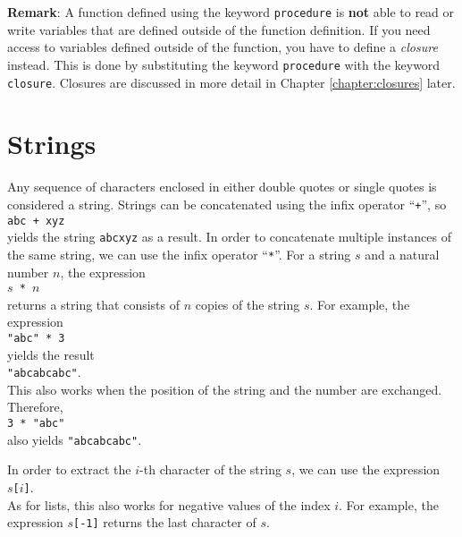 \noindent
\textbf{Remark}:
A function defined using the keyword \texttt{procedure} is \textbf{not} able to read or write
variables that are defined outside of the function definition.  If you need access to variables
defined outside of the function, you have to define a \emph{closure} instead.  This is done by
substituting the keyword \texttt{procedure} with the keyword \texttt{closure}.  Closures are
discussed in more detail in Chapter \ref{chapter:closures} later.


\section{Strings}
Any sequence of characters enclosed in either double quotes or single quotes is considered a string.
Strings can be concatenated using the infix operator ``\texttt{+}'', so
\\[0.2cm]
\hspace*{1.3cm}
\texttt{abc + xyz}
\\[0.2cm]
yields the string \texttt{abcxyz} as a result.
In order to concatenate multiple instances of the same string, we can use the infix
operator ``\texttt{*}''.  For a string $s$ and a natural number $n$, the expression
\\[0.2cm]
\hspace*{1.3cm}
\texttt{$s$ * $n$}
\\[0.2cm]
returns a string that consists of $n$ copies of the string $s$.  For example, the
expression 
\\[0.2cm]
\hspace*{1.3cm}
\texttt{"abc" * 3}
\\[0.2cm]
yields the result
\\[0.2cm]
\hspace*{1.3cm}
\texttt{"abcabcabc"}.
\\[0.2cm]
This also works when the position of the string and the number are exchanged.  Therefore,
\\[0.2cm]
\hspace*{1.3cm}
\texttt{3 * "abc"}
\\[0.2cm]
also yields \texttt{"abcabcabc"}.


In order to extract the $i$-th character of the string $s$, we can use the expression
\\[0.2cm]
\hspace*{1.3cm}
\texttt{$s$[$i$]}.
\\[0.2cm]
As for lists, this also works for negative values of the index $i$.  For example, the expression \texttt{$s$[-1]}
returns the last character of $s$.

